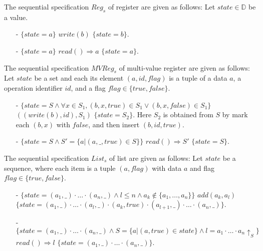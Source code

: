 \begin{example}[Register]
\label{definition:sequential specification of register}
The sequential specification $\mathit{Reg}_s$ of register are given as follows: Let $state \in \mathbb{D}$ be a value.
\begin{itemize}
\setlength{\itemsep}{0.5pt}
\item[-] $\{ state = a  \}$ $write(b)$ $\{ state = b \}$.
\item[-] $\{ state = a \}$ $read() \Rightarrow a$ $\{ state = a \}$.
\end{itemize}
\end{example}


\begin{example}
\label{definition:sequential specification of multi-value register}
The sequential specification $\mathit{MVReg}_s$ of multi-value register are given as follows: Let $state$ be a set and each its element $(a,id,flag)$ is a tuple of a data $a$, a operation identifier $id$, and a flag $flag \in \{ \mathit{true},\mathit{false} \}$.
\begin{itemize}
\setlength{\itemsep}{0.5pt}
\item[-] $\{ state = S \wedge \forall x \in S_1, (b,x,\mathit{true}) \in S_1 \vee (b,x,\mathit{false}) \in S_1 \}$ $((write(b),id),S_1)$ $\{ state = S_2 \}$. Here $S_2$ is obtained from $S$ by mark each $(b,x)$ with $\mathit{false}$, and then insert $(b,id,\mathit{true})$.
\item[-] $\{ state = S \wedge S' = \{ a \vert (a,\_,\mathit{true}) \in S \} \}$ $read() \Rightarrow S'$ $\{ state = S \}$.
\end{itemize}
\end{example}


\begin{example}
\label{definition:sequential specification of list with add-after interface}
The sequential specification $\mathit{List}_s$ of list are given as follows: Let $state$ be a sequence, where each item is a tuple $(a,flag)$ with data $a$ and flag $flag \in \{ \mathit{true},\mathit{false} \}$.
\begin{itemize}
\setlength{\itemsep}{0.5pt}
\item[-] $\{ state = (a_1,\_) \cdot \ldots \cdot (a_n,\_) \wedge l \leq n \wedge a_k \notin \{ a_1, \ldots, a_n \} \}$ $add(a_k,a_l)$ $\{ state = (a_1,\_) \cdot \ldots \cdot (a_l,\_) \cdot (a_k,\mathit{true}) \cdot (a_{l+1},\_) \cdot \ldots \cdot (a_n,\_) \}$.
\item[-] $\{ state = (a_1,\_) \cdot \ldots \cdot (a_n,\_) \wedge S = \{ a \vert (a,\mathit{true}) \in state \} \wedge l = a_1 \cdot \ldots \cdot a_n \uparrow_{S} \}$ $read() \Rightarrow l$ $\{ state = (a_1,\_) \cdot \ldots \cdot (a_n,\_) \}$.
\end{itemize}
\end{example}



